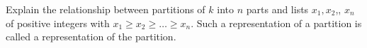 \documentclass{book}
\begin{document}
\setcounter{cpjt}{210}
\addtocounter{cpjt}{-1}
\begin{activity}\label{activity-203}
\hypertarget{p-1128}{}%
Explain the relationship between partitions of \(k\) into \(n\) parts and lists \(x_1,x_2\),\textellipsis{}, \(x_n\) of positive integers with \(x_1\ge x_2\ge\ldots \ge x_n\). Such a representation of a partition is called a  representation of the partition.%
\par\smallskip%
\noindent\end{activity}

\clearpage
\end{document}
